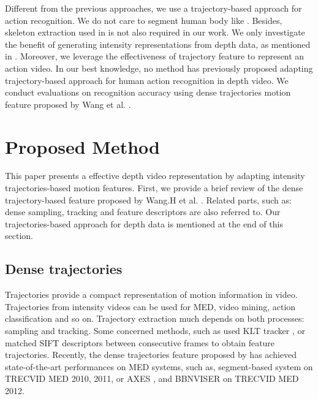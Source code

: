 \documentclass[review]{elsarticle}
\begin{document}
Different from the previous approaches, we use a trajectory-based approach for action recognition. We do not care to segment human body like \cite{li2010action,yang2012recognizing}. Besides, skeleton extraction used in \cite{yang2012eigenjoints, wang2012mining} is not also required in our work. We only investigate the benefit of generating intensity representations from depth data, as mentioned in \cite{li2010action,yang2012recognizing}. Moreover, we leverage the effectiveness of trajectory feature to represent an action video. In our best knowledge, no method has previously proposed adapting trajectory-based approach for human action recognition in depth video. We conduct evaluations on recognition accuracy using dense trajectories motion feature proposed by Wang et al. \cite{wang2011densetraj}.

\section{Proposed Method}
\label{lbl:ProposedMethod}

This paper presents a effective depth video representation by adapting intensity trajectories-based motion features. First, we provide a brief review of the dense trajectory-based feature proposed by Wang.H et al. \cite{wang2011densetraj}. Related parts, such as: dense sampling, tracking and feature descriptors are also referred to. Our trajectories-based approach for depth data is mentioned at the end of this section.

\subsection{Dense trajectories}
Trajectories provide a compact representation of motion information in video. Trajectories from intensity videos can be used for MED, video mining, action classification and so on. Trajectory extraction much depends on both processes: sampling and tracking. Some concerned methods, such as \cite{matikainen2009trajectons, messing2009activity} used KLT tracker \cite{lucas1981iterative}, or \cite{sun2009hierarchical} matched  SIFT descriptors between consecutive frames to obtain feature trajectories. Recently, the dense trajectories feature proposed by \cite{wang2011densetraj} has achieved state-of-the-art performances on MED systems, such as, segment-based system \cite{phan2014multimedia} on TRECVID MED 2010, 2011, or AXES \cite{oneata2012axes}, and BBNVISER \cite{natarajan2012bbn} on TRECVID MED 2012.
\end{document}
